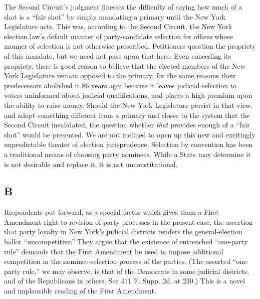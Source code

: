   The Second Circuit's judgment finesses the difficulty of saying how much of a shot is a ``fair shot'' by simply mandating a primary until the New York Legislature acts. This was, according to the Second Circuit, the New York election law's default manner of party-candidate selection for offices whose manner of selection is not otherwise prescribed. Petitioners question the propriety of this mandate, but we need not pass upon that here. Even conceding its propriety, there is good reason to believe that the elected members of the New York Legislature remain opposed to the primary, for the same reasons their predecessors abolished it 86 years ago: because it leaves judicial selection to voters uninformed about judicial qualifications, and places a high premium upon the ability to raise money. Should the New York Legislature persist in that view, and adopt something different from a primary and closer to the system that the Second Circuit invalidated, the question whether \emph{that} provides enough of a ``fair shot'' would be presented. We are not inclined to open up this new and excitingly unpredictable theater of election jurisprudence. Selection by convention has been a traditional means of choosing party nominees. While a State \newpage  may determine it is not desirable and replace it, it is not unconstitutional.

\subsection{B}

  Respondents put forward, as a special factor which gives them a First Amendment right to revision of party processes in the present case, the assertion that party loyalty in New York's judicial districts renders the general-election ballot ``uncompetitive.'' They argue that the existence of entrenched ``one-party rule'' demands that the First Amendment be used to impose additional competition in the nominee-selection process of the parties. (The asserted ``one-party rule,'' we may observe, is that of the Democrats in some judicial districts, and of the Republicans in others. See 411 F. Supp. 2d, at 230.) This is a novel and implausible reading of the First Amendment.

